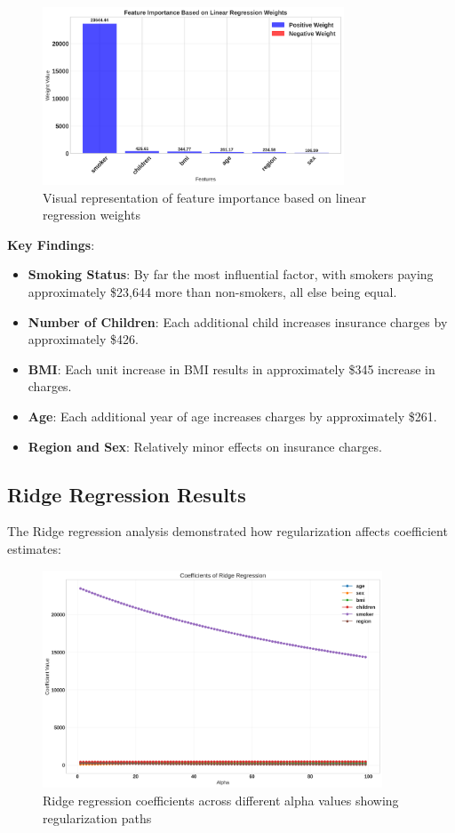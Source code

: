 \documentclass[12pt,a4paper]{article}
\begin{document}
\begin{figure}[H]
\centering
\includegraphics[width=0.8\textwidth]{feature_importance_weights.png}
\caption{Visual representation of feature importance based on linear regression weights}
\label{fig:feature_importance_weights}
\end{figure}

\textbf{Key Findings}:
\begin{itemize}
    \item \textbf{Smoking Status}: By far the most influential factor, with smokers paying approximately \$23,644 more than non-smokers, all else being equal.
    \item \textbf{Number of Children}: Each additional child increases insurance charges by approximately \$426.
    \item \textbf{BMI}: Each unit increase in BMI results in approximately \$345 increase in charges.
    \item \textbf{Age}: Each additional year of age increases charges by approximately \$261.
    \item \textbf{Region and Sex}: Relatively minor effects on insurance charges.
\end{itemize}

\newpage
\subsection{Ridge Regression Results}

The Ridge regression analysis demonstrated how regularization affects coefficient estimates:

\begin{figure}[H]
\centering
\includegraphics[width=0.9\textwidth]{ridge_regression_coefficients.png}
\caption{Ridge regression coefficients across different alpha values showing regularization paths}
\label{fig:ridge_regression_coefficients}
\end{figure}
\end{document}
